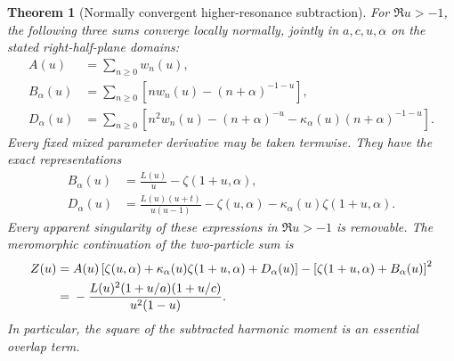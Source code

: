 \documentclass[11pt,letterpaper]{article}
\numberwithin{equation}{section}
\theoremstyle{plain}
\newtheorem{theorem}{Theorem}[section]
\theoremstyle{definition}
\theoremstyle{remark}
\begin{document}
\begin{theorem}[Normally convergent higher-resonance subtraction]
\label{res:thm:normal}
For $\Re u>-1$, the following three sums converge locally normally,
jointly in $a,c,u,\alpha$ on the stated right-half-plane domains:
\begin{align}
 A(u)&=\sum_{n\geq0}w_n(u),\label{res:eq:A}\\
 B_\alpha(u)&=\sum_{n\geq0}
    \left[nw_n(u)-(n+\alpha)^{-1-u}\right],\label{res:eq:B}\\
 D_\alpha(u)&=\sum_{n\geq0}\left[n^2w_n(u)
    -(n+\alpha)^{-u}
    -\kappa_\alpha(u)(n+\alpha)^{-1-u}\right].\label{res:eq:D}
\end{align}
Every fixed mixed parameter derivative may be taken termwise.  They
have the exact representations
\begin{align}
 B_\alpha(u)&=\frac{L(u)}u-\zeta(1+u,\alpha),\label{res:eq:Bexact}\\
 D_\alpha(u)&=\frac{L(u)(u+t)}{u(u-1)}
    -\zeta(u,\alpha)
    -\kappa_\alpha(u)\zeta(1+u,\alpha).\label{res:eq:Dexact}
\end{align}
Every apparent singularity of these expressions in $\Re u>-1$ is
removable.  The meromorphic continuation of the two-particle sum is
\begin{align}
 Z(u)={}&A(u)\left[\zeta(u,\alpha)
       +\kappa_\alpha(u)\zeta(1+u,\alpha)+D_\alpha(u)\right]
       -\left[\zeta(1+u,\alpha)+B_\alpha(u)\right]^2\notag\\
 ={}&-\frac{L(u)^2(1+u/a)(1+u/c)}{u^2(1-u)}.
 \label{res:eq:Z}
\end{align}
In particular, the square of the subtracted harmonic moment is an
essential overlap term.
\end{theorem}
\end{document}
